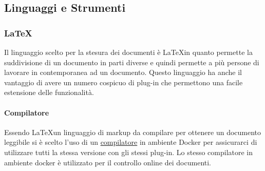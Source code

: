   \subsection{Linguaggi e Strumenti}
  \subsubsection{\LaTeX}
  Il linguaggio scelto per la stesura dei documenti è \LaTeX \space in quanto permette
  la suddivisione di un documento in parti diverse e quindi permette a più persone
  di lavorare in contemporanea ad un documento.
  Questo linguaggio ha anche il vantaggio di avere un numero cospicuo di plug-in
  che permettono una facile estensione delle funzionalità.

  \paragraph{Compilatore}
  Essendo \LaTeX \space un linguaggio di markup da compilare per ottenere un documento
  leggibile si è scelto l'uso di un
  \href{https://github.com/dante-ev/docker-texlive}{compilatore} in ambiente Docker\glo
  per assicurarci di utilizzare tutti la stessa versione con gli stessi plug-in.
  Lo stesso compilatore in ambiente docker è utilizzato per il controllo online dei
  documenti.
